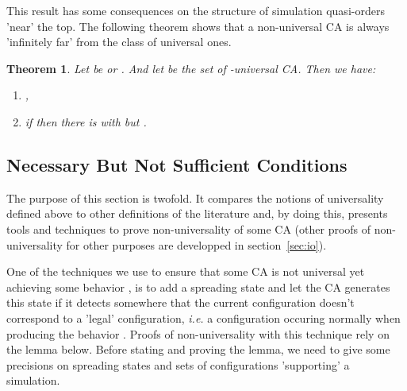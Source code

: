 \documentclass[a4paper]{elsarticle}
\def\qed{\relax\ifmmode\hskip2em \blacksquare\else\unskip\nobreak\hfill\hskip1em \fi}
\newtheorem{thm}{Theorem}[section]
\begin{document}
This result has some consequences on the structure of simulation
quasi-orders 'near' the top. The following theorem shows that a
non-universal CA is always 'infinitely far' from the class of
universal ones.

\begin{thm}
  \label{thm:notuniv}
  Let  be  or . And let  be the
  set of -universal CA. Then we have:
  \begin{enumerate}
  \item ,
  \item if  then there is  with
 but .
  \end{enumerate}
\end{thm}
\begin{pf}
  \par\noindent
\end{pf}

\subsection{Necessary But Not Sufficient Conditions}
\label{sec:notuniv}

The purpose of this section is twofold. It compares the notions of
universality defined above to other definitions of the literature and,
by doing this, presents tools and techniques to prove non-universality
of some CA (other proofs of non-universality for other purposes are
developped in section~\ref{sec:io}). 

One of the techniques we use to ensure that some CA is not universal
yet achieving some behavior , is to add a spreading state and let
the CA generates this state if it detects somewhere that the current
configuration doesn't correspond to a 'legal' configuration,
\textit{i.e.} a configuration occuring normally when producing the
behavior .  Proofs of non-universality with this technique rely on
the lemma below. Before stating and proving the lemma, we need to give
some precisions on spreading states and sets of configurations
'supporting' a simulation.
\end{document}
